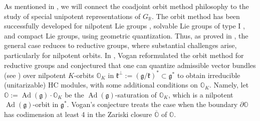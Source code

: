 \documentclass[11pt, a4paper]{amsart}
\newcommand{\orb}{\mathbb{O}}
\newcommand{\orbk}{\orb_{K}}
\newcommand{\fg}{\mathfrak{g}}
\newcommand{\fk}{\mathfrak{k}}
\DeclareMathOperator{\Ad}{Ad}
\newcommand{\R}{\mathbb{R}}
\newcommand{\GR}{G_\R}
\theoremstyle{definition}
\numberwithin{equation}{section}
\begin{document}
As mentioned in , we will connect the coadjoint orbit method philosophy to the study of special unipotent representations of $\GR$. The orbit method has been successfully developed for nilpotent Lie groups \cite{Kirillov_nil}, solvable Lie groups of type I \cite{AK}, and compact Lie groups, using geometric quantization. Thus, as proved in \cite{Duflo}, the general case reduces to reductive groups, where substantial challenges arise, particularly for nilpotent orbits.
In \cite{Vogan_AV}, Vogan reformulated the orbit method for reductive groups and conjectured that one can quantize admissible vector bundles (see ) over nilpotent $K$-orbits $\orbk$ in $\fk^\perp := (\fg/\fk)^* \subset \fg^*$ to obtain irreducible (unitarizable) HC modules, with some additional conditions on $\orbk$. Namely, let $\orb := \Ad(\fg) \cdot \orbk$ be the $\Ad(\fg)$-saturation of $\orbk$, which is a nilpotent $\Ad(\fg)$-orbit in $\fg^*$. Vogan's conjecture treats the case when the boundary $\partial\orb$ has codimension at least 4 in the Zariski closure $\overline{\orb}$ of $\orb$. 

\end{document}
